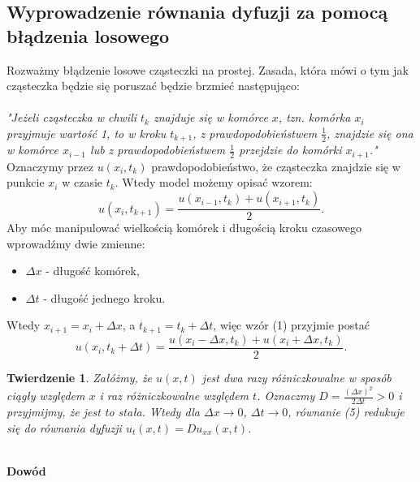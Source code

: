 \documentclass[a4paper,12pt]{article}
\newtheorem{tw}{Twierdzenie}
\begin{document}
\subsection{Wyprowadzenie równania dyfuzji za pomocą błądzenia losowego}

Rozważmy błądzenie losowe cząsteczki na prostej. Zasada, która mówi o tym jak cząsteczka będzie się poruszać będzie brzmieć następująco:\\\\
\textit {"Jeżeli cząsteczka w chwili $t_{k}$ znajduje się w komórce $x$, tzn. komórka $x_i$ przyjmuje wartość 1, to w kroku $t_{k+1}$, z prawdopodobieństwem $\frac{1}{2}$, znajdzie się ona w komórce $x_{i-1}$ lub z prawdopodobieństwem $\frac{1}{2}$ przejdzie do komórki $x_{i+1}$."}\\
Oznaczymy przez $u(x_i,t_k)$ prawdopodobieństwo, że cząsteczka znajdzie się w punkcie $x_i$ w czasie $t_k$. Wtedy model możemy opisać wzorem:
\begin{equation}
    u(x_i,t_{k+1})= \frac{ u(x_{i-1},t_k)+u(x_{i+1},t_k) }{2}.
\end{equation}
Aby móc manipulować wielkością komórek i długością kroku czasowego wprowadźmy dwie zmienne:

\begin{itemize}
    \item $\Delta x$ - długość komórek,
    \item $\Delta t$ - długość jednego kroku.
\end{itemize}

Wtedy $x_{i+1}=x_i+\Delta x$, a $t_{k+1}=t_{k}+\Delta t$, więc wzór (1) przyjmie postać
\begin{equation}
    u(x_i,t_k+\Delta t)= \frac{ u(x_{i}-\Delta x,t_k)+u(x_{i}+\Delta x,t_k) }{2}. 
\end{equation}

\begin{tw}
Załóżmy, że $u(x, t)$ jest dwa razy różniczkowalne w sposób ciągły względem $x$ i raz różniczkowalne względem $t$. Oznaczmy $D=\frac{(\Delta x)^2}{2\Delta t}>0$ i przyjmijmy, że jest to stała. Wtedy dla  $\Delta x \rightarrow 0$, $\Delta t \rightarrow 0$, równanie (5) redukuje się do równania dyfuzji $u_t(x,t)=Du_{xx}(x,t)$.

\end{tw}
\\
\textbf{Dowód}\\
\end{document}
